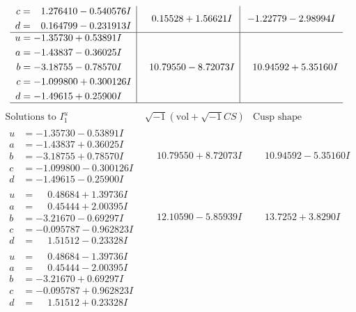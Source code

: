 \documentclass[1p]{elsarticle_modified}
\theoremstyle{definition}
\newcommand{\I}{\sqrt{-1}}
\begin{document}
$$\begin{array}{c|c|c}
\begin{aligned}
c &= \phantom{-}1.276410 - 0.540576 I \\
d &= \phantom{-}0.164799 - 0.231913 I\end{aligned}
 & \phantom{-}0.15528 + 1.56621 I & -1.22779 - 2.98994 I \\ \hline\begin{aligned}
u &= -1.35730 + 0.53891 I \\
a &= -1.43837 - 0.36025 I \\
b &= -3.18755 - 0.78570 I \\
c &= -1.099800 + 0.300126 I \\
d &= -1.49615 + 0.25900 I\end{aligned}
 & \phantom{-}10.79550 - 8.72073 I & \phantom{-}10.94592 + 5.35160 I\\
 \hline 
 \end{array}$$\newpage$$\begin{array}{c|c|c}  
\text{Solutions to }I^u_{1}& \I (\text{vol} + \sqrt{-1}CS) & \text{Cusp shape}\\
 \hline 
\begin{aligned}
u &= -1.35730 - 0.53891 I \\
a &= -1.43837 + 0.36025 I \\
b &= -3.18755 + 0.78570 I \\
c &= -1.099800 - 0.300126 I \\
d &= -1.49615 - 0.25900 I\end{aligned}
 & \phantom{-}10.79550 + 8.72073 I & \phantom{-}10.94592 - 5.35160 I \\ \hline\begin{aligned}
u &= \phantom{-}0.48684 + 1.39736 I \\
a &= \phantom{-}0.45444 + 2.00395 I \\
b &= -3.21670 - 0.69297 I \\
c &= -0.095787 - 0.962823 I \\
d &= \phantom{-}1.51512 - 0.23328 I\end{aligned}
 & \phantom{-}12.10590 - 5.85939 I & \phantom{-}13.7252 + 3.8290 I \\ \hline\begin{aligned}
u &= \phantom{-}0.48684 - 1.39736 I \\
a &= \phantom{-}0.45444 - 2.00395 I \\
b &= -3.21670 + 0.69297 I \\
c &= -0.095787 + 0.962823 I \\
d &= \phantom{-}1.51512 + 0.23328 I\end{aligned}

\end{array}$$
\end{document}
